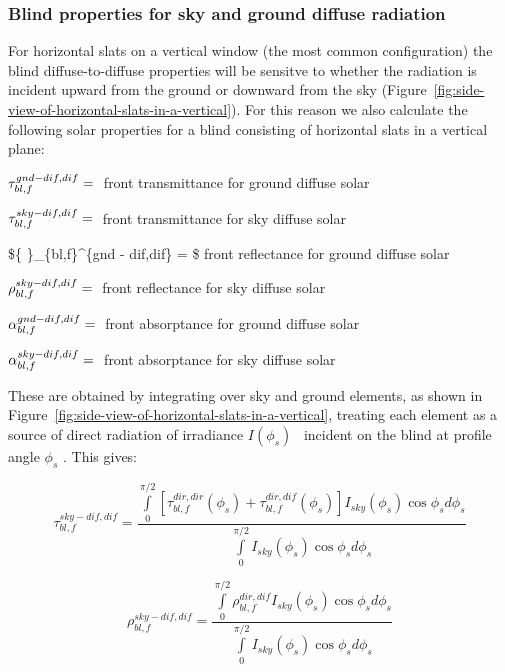 \subsubsection{Blind properties for sky and ground diffuse radiation}\label{blind-properties-for-sky-and-ground-diffuse-radiation}

For horizontal slats on a vertical window (the most common configuration) the blind diffuse-to-diffuse properties will be sensitve to whether the radiation is incident upward from the ground or downward from the sky (Figure~\ref{fig:side-view-of-horizontal-slats-in-a-vertical}). For this reason we also calculate the following solar properties for a blind consisting of horizontal slats in a vertical plane:

\(\tau_{bl,f}^{gnd - dif,dif} = {\rm{ }}\) front transmittance for ground diffuse solar

\(\tau_{bl,f}^{sky - dif,dif} = {\rm{ }}\) front transmittance for sky diffuse solar

\$\{\rm{ }\}\rho\_\{bl,f\}\^{}\{gnd - dif,dif\} = \$ front reflectance for ground diffuse solar

\(\rho_{bl,f}^{sky - dif,dif} = {\rm{ }}\) front reflectance for sky diffuse solar

\(\alpha_{bl,f}^{gnd - dif,dif} = {\rm{ }}\) front absorptance for ground diffuse solar

\(\alpha_{bl,f}^{sky - dif,dif} = {\rm{ }}\) front absorptance for sky diffuse solar

These are obtained by integrating over sky and ground elements, as shown in Figure~\ref{fig:side-view-of-horizontal-slats-in-a-vertical}, treating each element as a source of direct radiation of irradiance \(I({\phi_s})\) ~incident on the blind at profile angle \({\phi_s}\) . This gives:

\begin{equation}
\tau_{bl,f}^{sky - dif,dif} = \frac{{\int\limits_0^{\pi /2} {\left[ {\tau_{bl,f}^{dir,dir}({\phi_s}) + \tau_{bl,f}^{dir,dif}({\phi_s})} \right]{I_{sky}}({\phi_s})\cos {\phi_s}d{\phi_s}} }}{{\int\limits_0^{\pi /2} {{I_{sky}}({\phi_s})\cos {\phi_s}d{\phi_s}} }}
\end{equation}

\begin{equation}
\rho_{bl,f}^{sky - dif,dif} = \frac{{\int\limits_0^{\pi /2} {\rho_{bl,f}^{dir,dif}{I_{sky}}({\phi_s})\cos {\phi_s}d{\phi_s}} }}{{\int\limits_0^{\pi /2} {{I_{sky}}({\phi_s})\cos {\phi_s}d{\phi_s}} }}
\end{equation}

